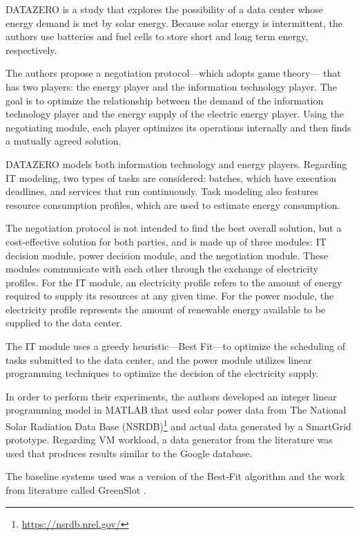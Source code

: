 \documentclass[12pt,a4paper]{article}
\begin{document}
DATAZERO \citep{datazero} is a study that explores the possibility of a data center whose energy demand is met by solar energy. Because solar energy is intermittent, the authors use batteries and fuel cells to store short and long term energy, respectively.

The authors propose a negotiation protocol---which adopts game theory--- that has two players: the energy player and the information technology player. The goal is to optimize the relationship between the demand of the information technology player and the energy supply of the electric energy player. Using the negotiating module, each player optimizes its operations internally and then finds a mutually agreed solution.

DATAZERO models both information technology and energy players. Regarding IT modeling, two types of tasks are considered: batches, which have execution deadlines, and services that run continuously. Task modeling also features resource consumption profiles, which are used to estimate energy consumption.

The negotiation protocol is not intended to find the best overall solution, but a cost-effective solution for both parties, and is made up of three modules: IT decision module, power decision module, and the negotiation module. These modules communicate with each other through the exchange of electricity profiles. For the IT module, an electricity profile refers to the amount of energy required to supply its resources at any given time. For the power module, the electricity profile represents the amount of renewable energy available to be supplied to the data center.

The IT module uses a greedy heuristic---Best Fit---to optimize the scheduling of tasks submitted to the data center, and the power module utilizes linear programming techniques to optimize the decision of the electricity supply.

In order to perform their experiments, the authors developed an integer linear programming model in MATLAB that used solar power data from The National Solar Radiation Data Base (NSRDB)\footnote{\url{https://nsrdb.nrel.gov/}} and actual data generated by a SmartGrid prototype. Regarding VM workload, a data generator from the literature was used that produces results similar to the Google database.

The baseline systems used was a version of the Best-Fit algorithm and the work from literature called GreenSlot\citep{GreenSlot} .
\end{document}
